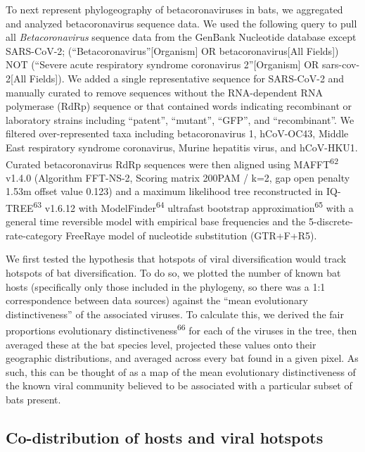 \documentclass[11pt]{article}
\begin{document}
To next represent phylogeography of betacoronaviruses in bats, we
aggregated and analyzed betacoronavirus sequence data. We used the
following query to pull all \emph{Betacoronavirus} sequence data from
the GenBank Nucleotide database except SARS-CoV-2;
(``Betacoronavirus''{[}Organism{]} OR betacoronavirus{[}All Fields{]})
NOT (``Severe acute respiratory syndrome coronavirus 2''{[}Organism{]}
OR sars-cov-2{[}All Fields{]}). We added a single representative
sequence for SARS-CoV-2 and manually curated to remove sequences without
the RNA-dependent RNA polymerase (RdRp) sequence or that contained words
indicating recombinant or laboratory strains including ``patent'',
``mutant'', ``GFP'', and ``recombinant''. We filtered over-represented
taxa including betacoronavirus 1, hCoV-OC43, Middle East respiratory
syndrome coronavirus, Murine hepatitis virus, and hCoV-HKU1. Curated
betacoronavirus RdRp sequences were then aligned using
MAFFT\textsuperscript{62} v1.4.0 (Algorithm FFT-NS-2, Scoring matrix
200PAM / k=2, gap open penalty 1.53m offset value 0.123) and a maximum
likelihood tree reconstructed in IQ-TREE\textsuperscript{63} v1.6.12
with ModelFinder\textsuperscript{64} ultrafast bootstrap
approximation\textsuperscript{65} with a general time reversible model
with empirical base frequencies and the 5-discrete-rate-category
FreeRaye model of nucleotide substitution (GTR+F+R5).

We first tested the hypothesis that hotspots of viral diversification
would track hotspots of bat diversification. To do so, we plotted the
number of known bat hosts (specifically only those included in the
phylogeny, so there was a 1:1 correspondence between data sources)
against the ``mean evolutionary distinctiveness'' of the associated
viruses. To calculate this, we derived the fair proportions evolutionary
distinctiveness\textsuperscript{66} for each of the viruses in the tree,
then averaged these at the bat species level, projected these values
onto their geographic distributions, and averaged across every bat found
in a given pixel. As such, this can be thought of as a map of the mean
evolutionary distinctiveness of the known viral community believed to be
associated with a particular subset of bats present.

\hypertarget{co-distribution-of-hosts-and-viral-hotspots}{%
\subsection{Co-distribution of hosts and viral
hotspots}\label{co-distribution-of-hosts-and-viral-hotspots}}
\end{document}
